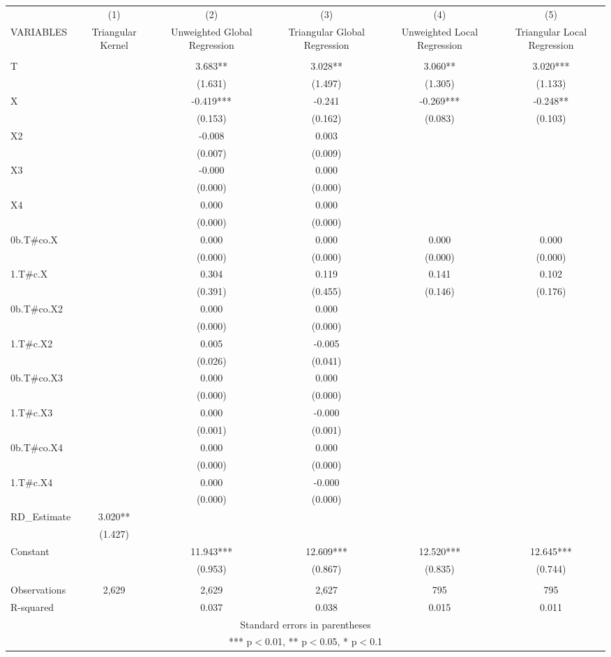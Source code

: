 \documentclass[]{article}
\begin{document}
\begin{tabular}{lccccc} \hline
 & (1) & (2) & (3) & (4) & (5) \\
VARIABLES & Triangular Kernel & Unweighted Global Regression & Triangular Global Regression & Unweighted Local Regression & Triangular Local Regression \\ \hline
 &  &  &  &  &  \\
T &  & 3.683** & 3.028** & 3.060** & 3.020*** \\
 &  & (1.631) & (1.497) & (1.305) & (1.133) \\
X &  & -0.419*** & -0.241 & -0.269*** & -0.248** \\
 &  & (0.153) & (0.162) & (0.083) & (0.103) \\
X2 &  & -0.008 & 0.003 &  &  \\
 &  & (0.007) & (0.009) &  &  \\
X3 &  & -0.000 & 0.000 &  &  \\
 &  & (0.000) & (0.000) &  &  \\
X4 &  & 0.000 & 0.000 &  &  \\
 &  & (0.000) & (0.000) &  &  \\
0b.T\#co.X &  & 0.000 & 0.000 & 0.000 & 0.000 \\
 &  & (0.000) & (0.000) & (0.000) & (0.000) \\
1.T\#c.X &  & 0.304 & 0.119 & 0.141 & 0.102 \\
 &  & (0.391) & (0.455) & (0.146) & (0.176) \\
0b.T\#co.X2 &  & 0.000 & 0.000 &  &  \\
 &  & (0.000) & (0.000) &  &  \\
1.T\#c.X2 &  & 0.005 & -0.005 &  &  \\
 &  & (0.026) & (0.041) &  &  \\
0b.T\#co.X3 &  & 0.000 & 0.000 &  &  \\
 &  & (0.000) & (0.000) &  &  \\
1.T\#c.X3 &  & 0.000 & -0.000 &  &  \\
 &  & (0.001) & (0.001) &  &  \\
0b.T\#co.X4 &  & 0.000 & 0.000 &  &  \\
 &  & (0.000) & (0.000) &  &  \\
1.T\#c.X4 &  & 0.000 & -0.000 &  &  \\
 &  & (0.000) & (0.000) &  &  \\
RD\_Estimate & 3.020** &  &  &  &  \\
 & (1.427) &  &  &  &  \\
Constant &  & 11.943*** & 12.609*** & 12.520*** & 12.645*** \\
 &  & (0.953) & (0.867) & (0.835) & (0.744) \\
 &  &  &  &  &  \\
Observations & 2,629 & 2,629 & 2,627 & 795 & 795 \\
 R-squared &  & 0.037 & 0.038 & 0.015 & 0.011 \\ \hline
\multicolumn{6}{c}{ Standard errors in parentheses} \\
\multicolumn{6}{c}{ *** p$<$0.01, ** p$<$0.05, * p$<$0.1} \\
\end{tabular}
\end{document}
